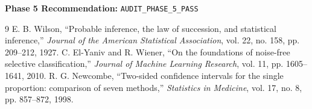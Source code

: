 \documentclass[10pt,a4paper]{article}
\begin{document}
\noindent \textbf{Phase 5 Recommendation:} \texttt{AUDIT\_PHASE\_5\_PASS}

\begin{thebibliography}{9}
 E. B. Wilson, ``Probable inference, the law of succession, and statistical inference,'' \textit{Journal of the American Statistical Association}, vol. 22, no. 158, pp. 209--212, 1927.
 C. El-Yaniv and R. Wiener, ``On the foundations of noise-free selective classification,'' \textit{Journal of Machine Learning Research}, vol. 11, pp. 1605--1641, 2010.
 R. G. Newcombe, ``Two-sided confidence intervals for the single proportion: comparison of seven methods,'' \textit{Statistics in Medicine}, vol. 17, no. 8, pp. 857--872, 1998.
\end{thebibliography}
\end{document}
